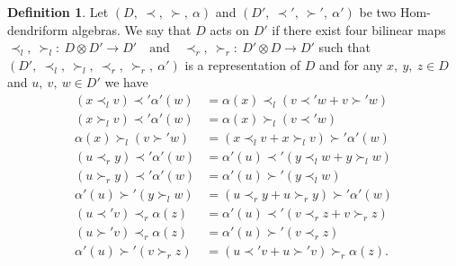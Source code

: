 \documentclass[11pt,twoside,reqno]{amsart}
\theoremstyle{plain}
\theoremstyle{definition}
\newtheorem{definition}[thm]{Definition}
\begin{document}
 \begin{definition}\label{d12}
 Let $(D ,\ \prec,\  \succ ,\ \alpha)$ and $(D' ,\ \prec',\  \succ ',\ \alpha')$ be two Hom-dendriform algebras. We say that $D$ acts on $D'$ if there exist four bilinear maps\
$
\prec_l,\  \succ_l :\ D \otimes D' \to D' \quad \text{and} \quad \prec_r ,\ \succ_r :\ D' \otimes D \to D'$
such that $(D' ,\ \prec_l ,\ \succ_l ,\ \prec_r  ,\ \succ_r ,\ \alpha')$ is a representation of $D$ and for any $x,\ y,\  z \in D$ and $u  ,\ v,\  w \in D'$ we have
\begin{align}
(x \prec_l v) \prec' \alpha'(w)& = \alpha(x) \prec_l (v \prec' w + v \succ' w) \label{eqtt}\\
(x \succ_l v) \prec' \alpha'(w)& = \alpha(x) \succ_l (v \prec' w) \label{rq2} \\
\alpha(x) \succ_l (v \succ' w)& = (x \prec_l v + x \succ_l v) \succ' \alpha'(w) \label{rq3}\\
(u \prec_r y) \prec' \alpha'(w)& = \alpha'(u) \prec' (y \prec_l w + y \succ_l w) \label{rq4} \\
(u \succ_r y) \prec' \alpha'(w)&= \alpha'(u) \succ' (y \prec_l w) \label{rq5}\\
\alpha'(u)\succ' (y \succ_l w)& = (u \prec_r y + u \succ_r y) \succ' \alpha'(w) \label{rq6}\\
(u \prec' v) \prec_r \alpha(z)& =\alpha'(u) \prec'  (v \prec_r z + v \succ_r z) \label{rq7}\\
(u \succ' v) \prec_r \alpha(z)&= \alpha'(u) \succ' (v \prec_r z) \label{rq8}\\
\alpha'(u) \succ' (v \succ_r z)&= (u \prec' v + u \succ' v) \succ_r \alpha(z).\label{eqttc}
\end{align}
\end{definition}
\end{document}
